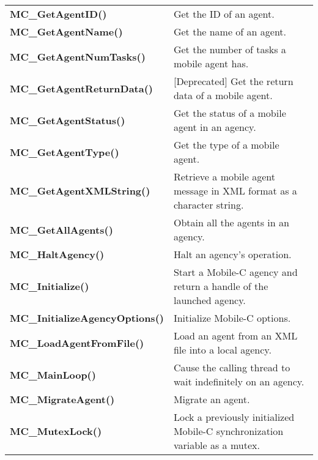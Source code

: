 \begin{table}[!hp]
\begin{center}
\begin{tabular}{p{78 mm}p{77 mm}}
{\bf MC\_GetAgentID()} \dotfill & Get the ID of an agent. \\
{\bf MC\_GetAgentName()} \dotfill & Get the name of an agent. \\
{\bf MC\_GetAgentNumTasks()} \dotfill & Get the number of tasks a mobile agent has. \\
{\bf MC\_GetAgentReturnData()} \dotfill & [Deprecated] Get the return data of a mobile agent. \\
{\bf MC\_GetAgentStatus()} \dotfill & Get the status of a mobile agent in an agency. \\
{\bf MC\_GetAgentType()} \dotfill & Get the type of a mobile agent. \\
{\bf MC\_GetAgentXMLString()} \dotfill & Retrieve a mobile agent message in XML format as a character string. \\
{\bf MC\_GetAllAgents()} \dotfill & Obtain all the agents in an agency. \\
{\bf MC\_HaltAgency()} \dotfill & Halt an agency's operation. \\
{\bf MC\_Initialize()} \dotfill & Start a Mobile-C agency and return a handle of the launched agency. \\
{\bf MC\_InitializeAgencyOptions()} \dotfill & Initialize Mobile-C options. \\
{\bf MC\_LoadAgentFromFile()} \dotfill & Load an agent from an XML file into a local agency.\\
{\bf MC\_MainLoop()} \dotfill & Cause the calling thread to wait indefinitely on an agency.\\
{\bf MC\_MigrateAgent()} \dotfill & Migrate an agent. \\
{\bf MC\_MutexLock()} \dotfill & Lock a previously initialized Mobile-C synchronization variable as a mutex. \\
\hline
\end{tabular}
\end{center}
\end{table}
\pagebreak

